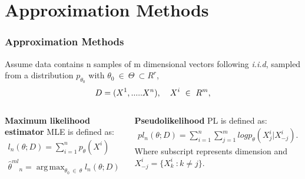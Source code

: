 \documentclass[10pt, blue,subsection=true, compress]{beamer}
\DeclareMathOperator*{\argmax}{arg\,max}
\begin{document}
\section{Approximation Methods}
\begin{frame}\frametitle{Approximation Methods}
\begin{block}{}
 Assume data contains n samples of m dimensional vectors 
following \textit{i.i.d}, sampled from a distribution 
$p_{\theta_{0}}$ with $\theta_{0} ~ \in ~\Theta ~ \subset R^r $,
\begin{equation*}
 D = (X^1,.....X^n ),  \: \hspace{3mm}   X^i  ~\in ~ R^m ,
\end{equation*}
\end{block}


\begin{columns}[t]
\begin{flushleft}
\begin{block}{\textbf{Maximum likelihood estimator}} 
MLE is defined as:
\begin{align}
 l_n(\theta ; D) = \sum_{i=1}^n p_{\theta}(X^i)\\
\nonumber {\widehat{\theta}^{ml}}_n  =  \argmax_{\theta_{0} ~\in~ \theta}  l_n (\theta ; D)
\end{align}

\end{block}
\end{flushleft}
\begin{block}{ \textbf{Pseudolikelihood}}
PL is defined as:
\begin{align}
pl_n (\theta ; D) = \sum_{i=1}^n \sum_{j=1}^m log
p_{\theta}({X^i_j} | {X^i_{-j}}). 
\end{align}
Where subscript represents dimension and $X_{-j}^i = \{ X_k^i ~: k \neq j\}$.
\end{block}
\end{columns}
\end{frame}
\end{document}
